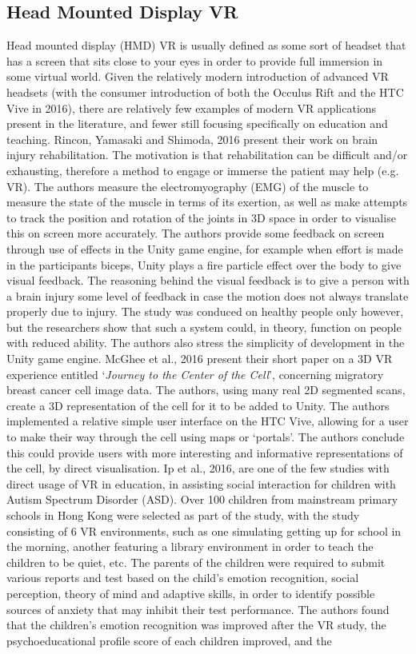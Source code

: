 \documentclass[11pt]{report}
\begin{document}
\subsection{Head Mounted Display VR}
Head mounted display (HMD) VR is usually defined as some sort of headset that has a screen that sits close to your eyes in order to provide full immersion in some virtual world. Given the relatively modern introduction of advanced VR headsets (with the consumer introduction of both the Occulus Rift and the HTC Vive in 2016), there are relatively few examples of modern VR applications present in the literature, and fewer still focusing specifically on education and teaching. Rincon, Yamasaki and Shimoda, 2016\cite{Rincon2016} present their work on brain injury rehabilitation. The motivation is that rehabilitation can be difficult and/or exhausting, therefore a method to engage or immerse the patient may help (e.g. VR). The authors measure the electromyography (EMG) of the muscle to measure the state of the muscle in terms of its exertion, as well as make attempts to track the position and rotation of the joints in 3D space in order to visualise this on screen more accurately. The authors provide some feedback on screen through use of effects in the Unity game engine, for example when effort is made in the participants biceps, Unity plays a fire particle effect over the body to give visual feedback. The reasoning behind the visual feedback is to give a person with a brain injury some level of feedback in case the motion does not always translate properly due to injury. The study was conduced on healthy people only however, but the researchers show that such a system could, in theory, function on people with reduced ability. The authors also stress the simplicity of development in the Unity game engine. McGhee et al., 2016\cite{McGhee2016} present their short paper on a 3D VR experience entitled `\textit{Journey to the Center of the Cell}', concerning migratory breast cancer cell image data. The authors, using many real 2D segmented scans, create a 3D representation of the cell for it to be added to Unity. The authors implemented a relative simple user interface on the HTC Vive, allowing for a user to make their way through the cell using maps or `portals'. The authors conclude this could provide users with more interesting and informative representations of the cell, by direct visualisation. Ip et al., 2016\cite{Ip2016}, are one of the few studies with direct usage of VR in education, in assisting social interaction for children with Autism Spectrum Disorder (ASD). Over 100 children from mainstream primary schools in Hong Kong were selected as part of the study, with the study consisting of 6 VR environments, such as one simulating getting up for school in the morning, another featuring a library environment in order to teach the children to be quiet, etc. The parents of the children were required to submit various reports and test based on the child's emotion recognition, social perception, theory of mind and adaptive skills, in order to identify possible sources of anxiety that may inhibit their test performance. The authors found that the children's emotion recognition was improved after the VR study, the psychoeducational profile score of each children improved, and the 
\end{document}
